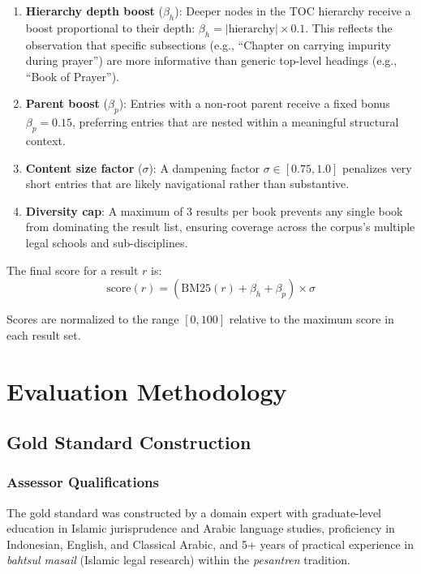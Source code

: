 \documentclass[preprint,12pt,numbers]{elsarticle}
\begin{document}
\begin{enumerate}
    \item \textbf{Hierarchy depth boost} ($\beta_h$): Deeper nodes in the TOC hierarchy receive a boost proportional to their depth: $\beta_h = |\text{hierarchy}| \times 0.1$. This reflects the observation that specific subsections (e.g., ``Chapter on carrying impurity during prayer'') are more informative than generic top-level headings (e.g., ``Book of Prayer'').

    \item \textbf{Parent boost} ($\beta_p$): Entries with a non-root parent receive a fixed bonus $\beta_p = 0.15$, preferring entries that are nested within a meaningful structural context.

    \item \textbf{Content size factor} ($\sigma$): A dampening factor $\sigma \in [0.75, 1.0]$ penalizes very short entries that are likely navigational rather than substantive.

    \item \textbf{Diversity cap}: A maximum of 3 results per book prevents any single book from dominating the result list, ensuring coverage across the corpus's multiple legal schools and sub-disciplines.
\end{enumerate}

The final score for a result $r$ is:
\begin{equation}
    \text{score}(r) = \left(\text{BM25}(r) + \beta_h + \beta_p\right) \times \sigma
    \label{eq:scoring}
\end{equation}

Scores are normalized to the range $[0, 100]$ relative to the maximum score in each result set.

\section{Evaluation Methodology}
\label{sec:methodology}

\subsection{Gold Standard Construction}
\label{sec:gold-standard}

\subsubsection{Assessor Qualifications}
The gold standard was constructed by a domain expert with graduate-level education in Islamic jurisprudence and Arabic language studies, proficiency in Indonesian, English, and Classical Arabic, and 5+ years of practical experience in \textit{bahtsul masail} (Islamic legal research) within the \textit{pesantren} tradition.
\end{document}
